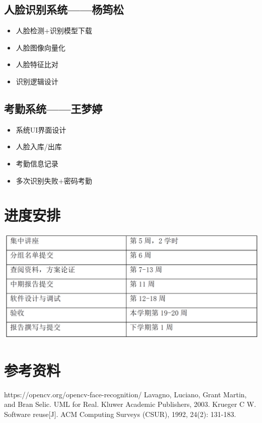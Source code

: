 \documentclass{article}
\begin{document}
\subsection{人脸识别系统——杨筠松}
\begin{itemize}
    \item 人脸检测+识别模型下载
    \item 人脸图像向量化
    \item 人脸特征比对
    \item 识别逻辑设计
\end{itemize}

\subsection{考勤系统——王梦婷}
\begin{itemize}
    \item 系统UI界面设计
    \item 人脸入库/出库
    \item 考勤信息记录
    \item 多次识别失败+密码考勤
\end{itemize}

\section{进度安排}

\includegraphics[scale=0.15] {imgs/进度安排.png}

\section{参考资料}
\begin{thebibliography}{00}
 https://opencv.org/opencv-face-recognition/
 Lavagno, Luciano, Grant Martin, and Bran Selic. UML for Real. Kluwer Academic Publishers, 2003.
 Krueger C W. Software reuse[J]. ACM Computing Surveys (CSUR), 1992, 24(2): 131-183.
\end{thebibliography}
\end{document}
